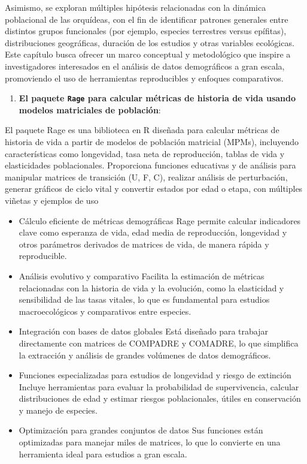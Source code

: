 \documentclass[
  12pt,
  letterpaper,
]{book}
\providecommand{\tightlist}{%
  \setlength{\itemsep}{0pt}\setlength{\parskip}{0pt}}\usepackage{longtable,booktabs,array}
\begin{document}
Asimismo, se exploran múltiples hipótesis relacionadas con la dinámica
poblacional de las orquídeas, con el fin de identificar patrones
generales entre distintos grupos funcionales (por ejemplo, especies
terrestres versus epífitas), distribuciones geográficas, duración de los
estudios y otras variables ecológicas. Este capítulo busca ofrecer un
marco conceptual y metodológico que inspire a investigadores interesados
en el análisis de datos demográficos a gran escala, promoviendo el uso
de herramientas reproducibles y enfoques comparativos.

\begin{enumerate}
\def\labelenumi{\arabic{enumi}.}
\setcounter{enumi}{17}
\tightlist
\item
  \textbf{El paquete \texttt{Rage} para calcular métricas de historia de
  vida usando modelos matriciales de población}:
\end{enumerate}

El paquete Rage es una biblioteca en R diseñada para calcular métricas
de historia de vida a partir de modelos de población matricial (MPMs),
incluyendo características como longevidad, tasa neta de reproducción,
tablas de vida y elasticidades poblacionales. Proporciona funciones
educativas y de análisis para manipular matrices de transición (U, F,
C), realizar análisis de perturbación, generar gráficos de ciclo vital y
convertir estados por edad o etapa, con múltiples viñetas y ejemplos de
uso

\begin{itemize}
\item
  Cálculo eficiente de métricas demográficas Rage permite calcular
  indicadores clave como esperanza de vida, edad media de reproducción,
  longevidad y otros parámetros derivados de matrices de vida, de manera
  rápida y reproducible.
\item
  Análisis evolutivo y comparativo Facilita la estimación de métricas
  relacionadas con la historia de vida y la evolución, como la
  elasticidad y sensibilidad de las tasas vitales, lo que es fundamental
  para estudios macroecológicos y comparativos entre especies.
\item
  Integración con bases de datos globales Está diseñado para trabajar
  directamente con matrices de COMPADRE y COMADRE, lo que simplifica la
  extracción y análisis de grandes volúmenes de datos demográficos.
\item
  Funciones especializadas para estudios de longevidad y riesgo de
  extinción Incluye herramientas para evaluar la probabilidad de
  supervivencia, calcular distribuciones de edad y estimar riesgos
  poblacionales, útiles en conservación y manejo de especies.
\item
  Optimización para grandes conjuntos de datos Sus funciones están
  optimizadas para manejar miles de matrices, lo que lo convierte en una
  herramienta ideal para estudios a gran escala.
\end{itemize}
\end{document}
